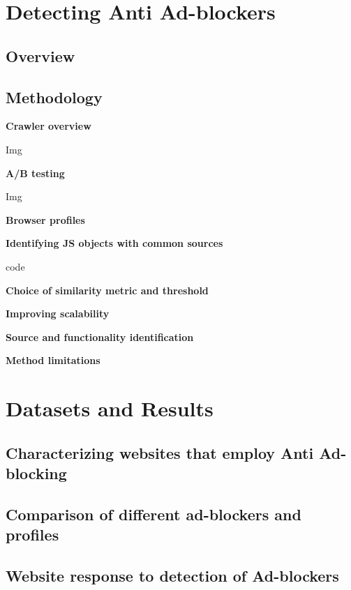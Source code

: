 \documentclass[runningheads,a4paper]{llncs}
\begin{document}
\section{Detecting Anti Ad-blockers}

\subsection{Overview}
    
\subsection{Methodology}
    
\textbf{Crawler overview}
        
            Img
            
\textbf{A/B testing}
        
            Img
            
\textbf{Browser profiles}
        
\textbf{Identifying JS objects with common sources}
        
            code
            
\textbf{Choice of similarity metric and threshold}
        
\textbf{Improving scalability}
        
\textbf{Source and functionality identification}
        
\textbf{Method limitations}
        
\section{Datasets and Results}

\subsection{Characterizing websites that employ Anti Ad-blocking}
    
\subsection{Comparison of different ad-blockers and profiles}
    
\subsection{Website response to detection of Ad-blockers}
    
\end{document}
